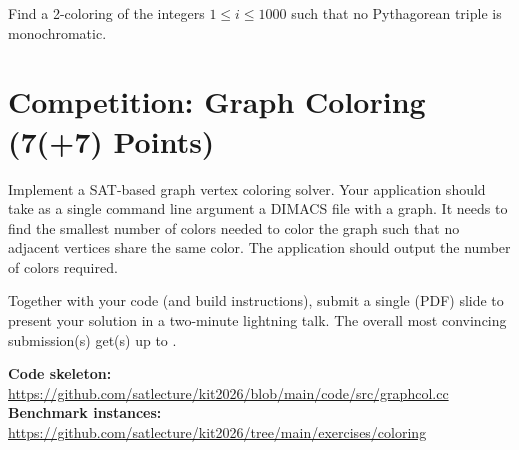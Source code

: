 \documentclass[a4paper]{article}
\begin{document}
Find a 2-coloring of the integers $1 \leq i \leq 1000$ such that no Pythagorean triple is monochromatic.


\section{Competition: Graph Coloring (7(+7) Points)}

Implement a SAT-based graph vertex coloring solver.
Your application should take as a single command line argument a DIMACS file with a graph.
It needs to find the smallest number of colors needed to color the graph such that no adjacent vertices share the same color.
The application should output the number of colors required.

Together with your code (and build instructions), submit a single (PDF) slide to present your solution in a two-minute lightning talk.
The overall most convincing submission(s) get(s) up to .

\vspace*{3mm}
\noindent
\textbf{Code skeleton:}\\
\url{https://github.com/satlecture/kit2026/blob/main/code/src/graphcol.cc}\\[1em]
\noindent
\textbf{Benchmark instances:}\\
\url{https://github.com/satlecture/kit2026/tree/main/exercises/coloring}
\end{document}
